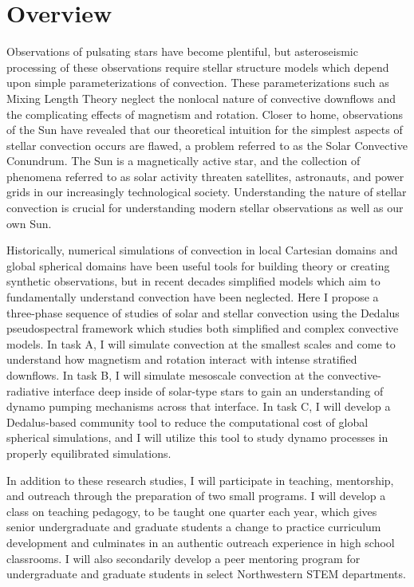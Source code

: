 \documentclass[aasms,11pt]{article}
\begin{document}
\section{Overview}
\vspace{-11pt}
Observations of pulsating stars have become plentiful, but asteroseismic processing of these observations require stellar structure models which depend upon simple parameterizations of convection. 
These parameterizations such as Mixing Length Theory neglect the nonlocal nature of convective downflows and the complicating effects of magnetism and rotation. 
Closer to home, observations of the Sun have revealed that our theoretical intuition for the simplest aspects of stellar convection occurs are flawed, a problem referred to as the Solar Convective Conundrum. 
The Sun is a magnetically active star, and the collection of phenomena referred to as solar activity threaten satellites, astronauts, and power grids in our increasingly technological society. 
Understanding the nature of stellar convection is crucial for understanding modern stellar observations as well as our own Sun.


Historically, numerical simulations of convection in local Cartesian domains and global spherical domains have been useful tools for building theory or creating synthetic observations, but in recent decades simplified models which aim to fundamentally understand convection have been neglected.
Here I propose a three-phase sequence of studies of solar and stellar convection using the Dedalus pseudospectral framework which studies both simplified and complex convective models. 
In task A, I will simulate convection at the smallest scales and come to understand how magnetism and rotation interact with intense stratified downflows. 
In task B, I will simulate mesoscale convection at the convective-radiative interface deep inside of solar-type stars to gain an understanding of dynamo pumping mechanisms across that interface. 
In task C, I will develop a Dedalus-based community tool to reduce the computational cost of global spherical simulations, and I will utilize this tool to study dynamo processes in properly equilibrated simulations.

In addition to these research studies, I will participate in teaching, mentorship, and outreach through the preparation of two small programs. 
I will develop a class on teaching pedagogy, to be taught one quarter each year, which gives senior undergraduate and graduate students a change to practice curriculum development and culminates in an authentic outreach experience in high school classrooms. 
I will also secondarily develop a peer mentoring program for undergraduate and graduate students in select Northwestern STEM departments.
\end{document}
